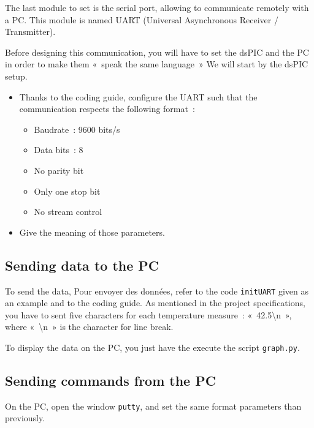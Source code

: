 \documentclass[11pt,a4paper]{article}
\theoremstyle{definition}%
\begin{document}
The last module to set is the serial port, allowing to communicate remotely with a PC.
This module is named UART (Universal Asynchronous Receiver / Transmitter).

Before designing this communication, you will have to set the dsPIC and the PC in order to make them «~speak the same language~»
We will start by the dsPIC setup.

\begin{itemize}
	\item Thanks to the coding guide, configure the UART such that the communication respects the following format~:
	\begin{itemize}
		\item Baudrate~: 9600 bits/s
		\item Data bits~: 8
		\item No parity bit
		\item Only one stop bit
		\item No stream control
	\end{itemize}
	\item Give the meaning of those parameters.
\end{itemize}

\subsection{Sending data to the PC}
To send the data, 
Pour envoyer des données, refer to the code \texttt{initUART} given as an example and to the coding guide.
As mentioned in the project specifications, you have to sent five characters for each temperature measure~: «~42.5\textbackslash n~», where «~\textbackslash n~» is the character for line break.

To display the data on the PC, you just have the execute the script \texttt{graph.py}.



\subsection{Sending commands from the PC}

On the PC, open the window \texttt{putty}, and set the same format parameters than previously.
\end{document}
